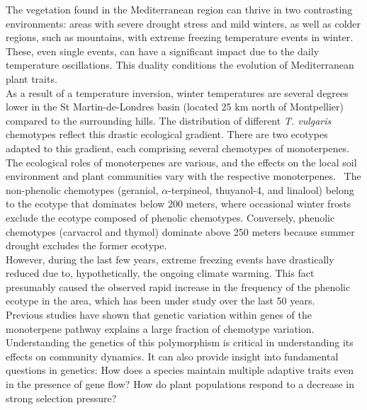 The vegetation found in the Mediterranean region can thrive in two contrasting environments: areas with severe drought stress and mild winters, as well as colder regions, such as mountains, with extreme freezing temperature events in winter. These, even single events, can have a significant impact due to the daily temperature oscillations. This duality conditions the evolution of Mediterranean plant traits.~\cite{thompsonPlantTraitsEcological2020}\\

As a result of a temperature inversion, winter temperatures are several degrees lower in the St Martin-de-Londres basin (located 25 km north of Montpellier) compared to the surrounding hills. The distribution of different \textit{T. vulgaris} chemotypes reflect this drastic ecological gradient. There are two ecotypes adapted to this gradient, each comprising several chemotypes of monoterpenes.~\cite{thompsonPlantTraitsEcological2020,bataillonGenotypePhenotypeGenetic2022} \\

The ecological roles of monoterpenes are various, and the effects on the local soil environment and plant communities vary with the respective monoterpenes.~\cite{bataillonGenotypePhenotypeGenetic2022} The non-phenolic chemotypes (geraniol, $\alpha$-terpineol, thuyanol-4, and linalool) belong to the ecotype that dominates below 200 meters, where occasional winter frosts exclude the ecotype composed of phenolic chemotypes. Conversely, phenolic chemotypes (carvacrol and thymol) dominate above 250 meters because summer drought excludes the former ecotype.~\cite{thompsonPlantTraitsEcological2020}\\

However, during the last few years, extreme freezing events have drastically reduced due to, hypothetically, the ongoing climate warming. This fact presumably caused the observed rapid increase in the frequency of the phenolic ecotype in the area, which has been under study over the last 50 years.~\cite{thompsonPlantTraitsEcological2020,bataillonGenotypePhenotypeGenetic2022} \\

Previous studies have shown that genetic variation within genes of the monoterpene pathway explains a large fraction of chemotype variation.~\cite{bataillonGenotypePhenotypeGenetic2022} Understanding the genetics of this polymorphism is critical in understanding its effects on community dynamics. It can also provide insight into fundamental questions in genetics: How does a species maintain multiple adaptive traits even in the presence of gene flow? How do plant populations respond to a decrease in strong selection pressure?~\cite{bataillonGenotypePhenotypeGenetic2022, thompsonPlantTraitsEcological2020}\\

